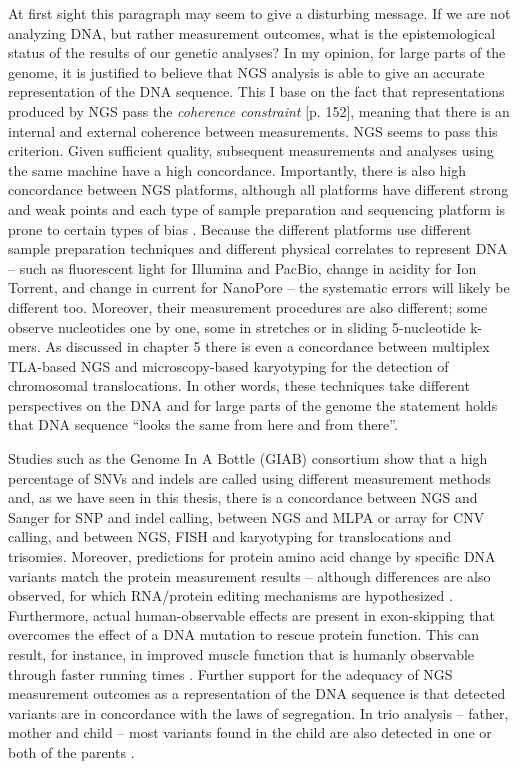 At first sight this paragraph may seem to give a disturbing message. 
If we are not analyzing DNA, but rather measurement outcomes, what is the epistemological status of the results of our genetic analyses? 
In my opinion, for large parts of the genome, it is justified to believe that NGS analysis is able to give an accurate representation of the DNA sequence. 
This I base on the fact that representations produced by NGS pass the \textsl{coherence constraint} [p. 152], meaning that there is an internal and external coherence between measurements. 
NGS seems to pass this criterion. 
Given sufficient quality, subsequent measurements and analyses using the same machine have a high concordance. 
Importantly, there is also high concordance between NGS platforms, although all platforms have different strong and weak points \cite{Rieber_2013} and each type of sample preparation and sequencing platform is prone to certain types of bias \cite{Aird_2011,Ross_2013}. 
Because the different platforms use different sample preparation techniques and different physical correlates to represent DNA – such as fluorescent light for Illumina and PacBio, change in acidity for Ion Torrent, and change in current for NanoPore – the systematic errors will likely be different too. 
Moreover, their measurement procedures are also different; some observe nucleotides one by one, some in stretches or in sliding 5-nucleotide k-mers. 
As discussed in chapter 5 there is even a concordance between multiplex TLA-based NGS and microscopy-based karyotyping for the detection of chromosomal translocations. 
In other words, these techniques take different perspectives on the DNA and for large parts of the genome the statement holds that DNA sequence “looks the same from here and from there”.

Studies such as the Genome In A Bottle (GIAB) consortium show that a high percentage of SNVs and indels are called using different measurement methods \cite{Zook_2018} and, as we have seen in this thesis, there is a concordance between NGS and Sanger for SNP and indel calling, between NGS and MLPA or array for CNV calling, and between NGS, FISH and karyotyping for translocations and trisomies. 
Moreover, predictions for protein amino acid change by specific DNA variants match the protein measurement results – although differences are also observed, for which RNA/protein editing mechanisms are hypothesized \cite{Wu_2012}. 
Furthermore, actual human-observable effects are present in exon-skipping that overcomes the effect of a DNA mutation to rescue protein function. 
This can result, for instance, in improved muscle function that is humanly observable through faster running times \cite{Nichols_2016}. 
Further support for the adequacy of NGS measurement outcomes as a representation of the DNA sequence is that detected variants are in concordance with the laws of segregation. 
In trio analysis – father, mother and child – most variants found in the child are also detected in one or both of the parents \cite{Francioli_2014}. 

